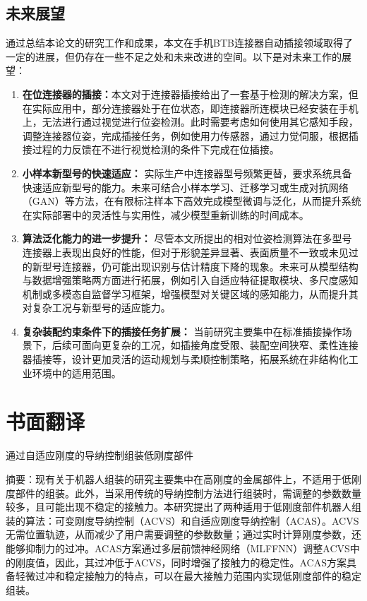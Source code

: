 \documentclass{Diploma}
\begin{document}
\section{未来展望}
通过总结本论文的研究工作和成果，本文在手机BTB连接器自动插接领域取得了一定的进展，但仍存在一些不足之处和未来改进的空间。以下是对未来工作的展望：
\begin{enumerate}
  \item \textbf{在位连接器的插接：}本文对于连接器插接给出了一套基于检测的解决方案，但在实际应用中，部分连接器处于在位状态，即连接器所连模块已经安装在手机上，无法进行通过视觉进行位姿检测。此时需要考虑如何使用其它感知手段，调整连接器位姿，完成插接任务，例如使用力传感器，通过力觉伺服，根据插接过程的力反馈在不进行视觉检测的条件下完成在位插接。
  \item \textbf{小样本新型号的快速适应：} 实际生产中连接器型号频繁更替，要求系统具备快速适应新型号的能力。未来可结合小样本学习、迁移学习或生成对抗网络（GAN）等方法，在有限标注样本下高效完成模型微调与泛化，从而提升系统在实际部署中的灵活性与实用性，减少模型重新训练的时间成本。
  \item \textbf{算法泛化能力的进一步提升：} 尽管本文所提出的相对位姿检测算法在多型号连接器上表现出良好的性能，但对于形貌差异显著、表面质量不一致或未见过的新型号连接器，仍可能出现识别与估计精度下降的现象。未来可从模型结构与数据增强策略两方面进行拓展，例如引入自适应特征提取模块、多尺度感知机制或多模态自监督学习框架，增强模型对关键区域的感知能力，从而提升其对复杂工况与新型号的适应能力。
  \item \textbf{复杂装配约束条件下的插接任务扩展：} 当前研究主要集中在标准插接操作场景下，后续可面向更复杂的工况，如插接角度受限、装配空间狭窄、柔性连接器插接等，设计更加灵活的运动规划与柔顺控制策略，拓展系统在非结构化工业环境中的适用范围。
\end{enumerate}

\StartAppendix%
\chapter{书面翻译}
\begin{center}
通过自适应刚度的导纳控制组装低刚度部件
\end{center}

摘要：现有关于机器人组装的研究主要集中在高刚度的金属部件上，不适用于低刚度部件的组装。此外，当采用传统的导纳控制方法进行组装时，需调整的参数数量较多，且可能出现不稳定的接触力。本研究提出了两种适用于低刚度部件机器人组装的算法：可变刚度导纳控制（ACVS）和自适应刚度导纳控制（ACAS）。ACVS无需位置轨迹，从而减少了用户需要调整的参数数量；通过实时计算刚度参数，还能够抑制力的过冲。ACAS方案通过多层前馈神经网络（MLFFNN）调整ACVS中的刚度值，因此，其过冲低于ACVS，同时增强了接触力的稳定性。ACAS方案具备轻微过冲和稳定接触力的特点，可以在最大接触力范围内实现低刚度部件的稳定组装。
\end{document}
